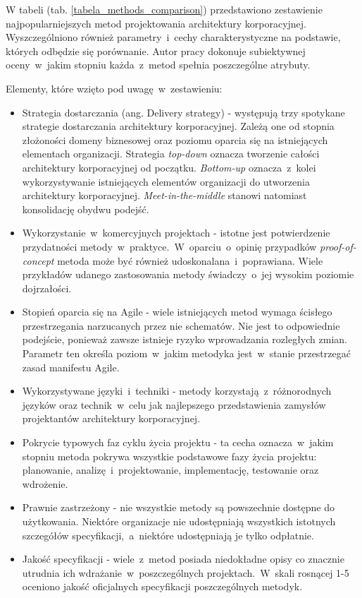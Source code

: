W tabeli (tab. \ref{tabela_methods_comparison}) przedstawiono zestawienie najpopularniejszych metod projektowania architektury korporacyjnej. Wyszczególniono również parametry~i~cechy charakterystyczne na podstawie, których odbędzie się porównanie. Autor pracy dokonuje subiektywnej oceny~w~jakim stopniu każda~z~metod spełnia poszczególne atrybuty.

Elementy, które wzięto pod uwagę~w~zestawieniu:
\begin{itemize}
\item{Strategia dostarczania (ang. Delivery strategy) - występują trzy spotykane strategie dostarczania architektury korporacyjnej. Zależą one od stopnia złożoności domeny biznesowej oraz poziomu oparcia się na istniejących elementach organizacji. Strategia \emph{top-down} oznacza tworzenie całości architektury korporacyjnej od początku. \emph{Bottom-up} oznacza~z~kolei wykorzystywanie istniejących elementów organizacji do utworzenia architektury korporacyjnej. \emph{Meet-in-the-middle} stanowi natomiast konsolidację obydwu podejść. }
\item{Wykorzystanie~w~komercyjnych projektach - istotne jest potwierdzenie przydatności metody~w~praktyce.~W~oparciu~o~opinię przypadków \emph{proof-of-concept} metoda może być również udoskonalana~i~poprawiana. Wiele przykładów udanego zastosowania metody świadczy~o~jej wysokim poziomie dojrzałości.}
\item{Stopień oparcia się na Agile - wiele istniejących metod wymaga ścisłego przestrzegania narzucanych przez nie schematów. Nie jest to odpowiednie podejście, ponieważ zawsze istnieje ryzyko wprowadzania rozległych zmian. Parametr ten określa poziom~w~jakim metodyka jest~w~stanie przestrzegać zasad manifestu Agile.}
\item{Wykorzystywane języki~i~techniki - metody korzystają~z~różnorodnych języków oraz technik~w~celu jak najlepszego przedstawienia zamysłów projektantów architektury korporacyjnej.}
\item{Pokrycie typowych faz cyklu życia projektu - ta cecha oznacza~w~jakim stopniu metoda pokrywa wszystkie podstawowe fazy życia projektu: planowanie, analizę~i~projektowanie, implementację, testowanie oraz wdrożenie.}
\item{Prawnie zastrzeżony - nie wszystkie metody są powszechnie dostępne do użytkowania. Niektóre organizacje nie udostępniają wszystkich istotnych szczegółów specyfikacji,~a~niektóre udostępniają je tylko odpłatnie.}
\item{Jakość specyfikacji - wiele~z~metod posiada niedokładne opisy co znacznie utrudnia ich wdrażanie~w~poszczególnych projektach.~W~skali rosnącej 1-5 oceniono jakość oficjalnych specyfikacji poszczególnych metodyk. }

\end{itemize}

